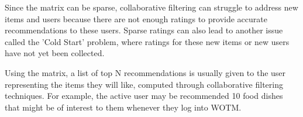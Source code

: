 Since the matrix can be sparse, collaborative filtering can struggle to address new items and users because there are not enough ratings to provide accurate recommendations to these users. Sparse ratings can also lead to another issue called the 'Cold Start' problem, where ratings for these new items or new users have not yet been collected. 






Using the matrix, a list of top N recommendations is usually given to the user representing the items they will like, computed through collaborative filtering techniques. For example, the active user may be recommended 10 food dishes that might be of interest to them whenever they log into WOTM.  


